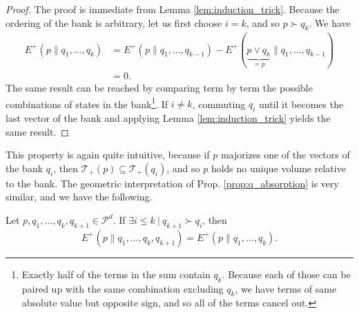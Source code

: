 \begin{proof}
    The proof is immediate from Lemma \ref{lem:induction_trick}. Because the ordering of the bank is arbitrary, let us first choose $i = k$, and so $p \succ q_k$. We have
    \begin{align}
        E^+(p \parallel q_1, \dots, q_k) &= E^+(p \parallel q_1, \dots, q_{k-1}) - E^+(\underbrace{p \vee q_k}_{= p} \parallel q_1, \dots, q_{k-1})\\
                                         &= 0.
    \end{align}
    The same result can be reached by comparing term by term the possible combinations of states in the bank\footnote{Exactly half of the terms in the sum contain $q_k$. Because each of those can be paired up with the same combination excluding $q_k$, we have terms of same absolute value but opposite sign, and so all of the terms cancel out.}. If $i \neq k$, commuting $q_i$ until it becomes the last vector of the bank and applying Lemma \ref{lem:induction_trick} yields the same result. \qedhere
\end{proof}

This property is again quite intuitive, because if $p$ majorizes one of the vectors of the bank $q_i$, then $\mathcal{T}_+(p) \subseteq \mathcal{T}_+(q_i)$, and so $p$ holds no unique volume relative to the bank. The geometric interpretation of Prop. \ref{prop:q_absorption} is very similar, and we have the following.

\begin{appendix_lemma}
    Let $p, q_1, \dots, q_k, q_{k+1} \in \mathcal{P}^d$. If $\exists i \leq k \: | \: q_{k+1} \succ q_i$, then
    \begin{equation}
        E^+(p \parallel q_1, \dots, q_k, q_{k+1}) = E^+(p \parallel q_1, \dots, q_k).
    \end{equation}
\end{appendix_lemma}

